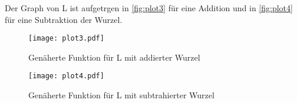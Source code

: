 \noindent
Der Graph von L ist aufgetrgen in \autoref{fig:plot3} für eine Addition und in \autoref{fig:plot4} für eine Subtraktion der Wurzel.

\begin{figure}
  \centering
  \texttt{[image: plot3.pdf]}
  \caption{Genäherte Funktion für L mit addierter Wurzel}
  \label{fig:plot3}
\end{figure}

\begin{figure}
  \centering
  \texttt{[image: plot4.pdf]}
  \caption{Genäherte Funktion für L mit subtrahierter Wurzel}
  \label{fig:plot4}
\end{figure}